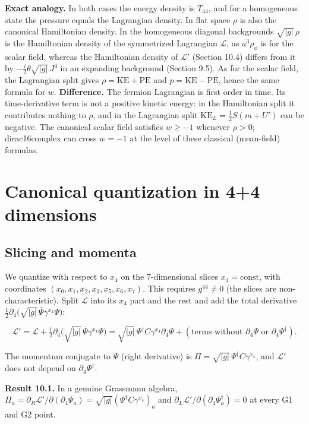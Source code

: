 \documentclass[11pt]{article}
\begin{document}
\textbf{Exact analogy.} In both cases the energy density is $T_{44}$, and for a homogeneous state the pressure equals the Lagrangian density. In flat space $\rho$ is also the canonical Hamiltonian density. In the homogeneous diagonal backgrounds $\sqrt{|g|}\,\rho$ is the Hamiltonian density of the symmetrized Lagrangian $\mathcal L$, as $a^3\rho_\phi$ is for the scalar field, whereas the Hamiltonian density of $\mathcal L'$ (Section 10.4) differs from it by $-\tfrac i2\theta\sqrt{|g|}\,J^4$ in an expanding background (Section 9.5). As for the scalar field, the Lagrangian split gives $\rho=\mathrm{KE}+\mathrm{PE}$ and $p=\mathrm{KE}-\mathrm{PE}$, hence the same formula for $w$. \textbf{Difference.} The fermion Lagrangian is first order in time. Its time-derivative term is not a positive kinetic energy: in the Hamiltonian split it contributes nothing to $\rho$, and in the Lagrangian split $\mathrm{KE}_L=\tfrac12S(m+U')$ can be negative. The canonical scalar field satisfies $w\ge-1$ whenever $\rho>0$; dirac16complex can cross $w=-1$ at the level of these classical (mean-field) formulas.

\section{Canonical quantization in 4+4 dimensions}

\subsection{Slicing and momenta}

We quantize with respect to $x_4$ on the 7-dimensional slices $x_4=\text{const}$, with coordinates $(x_0,x_1,x_2,x_3,x_5,x_6,x_7)$. This requires $g^{44}\ne0$ (the slices are non-characteristic). Split $\mathcal L$ into its $x_4$ part and the rest and add the total derivative $\tfrac12\partial_4\bigl(\sqrt{|g|}\,\bar\Psi\gamma^{x_4}\Psi\bigr)$:

\[
\mathcal L'=\mathcal L+\tfrac12\partial_4\bigl(\sqrt{|g|}\,\bar\Psi\gamma^{x_4}\Psi\bigr)=\sqrt{|g|}\,\Psi^\dagger C\gamma^{x_4}\partial_4\Psi+(\text{terms without }\partial_4\Psi\text{ or }\partial_4\Psi^\dagger).
\]

The momentum conjugate to $\Psi$ (right derivative) is $\Pi=\sqrt{|g|}\,\Psi^\dagger C\gamma^{x_4}$, and $\mathcal L'$ does not depend on $\partial_4\Psi^\dagger$.

\textbf{Result 10.1.} In a genuine Grassmann algebra, $\Pi_a=\partial_R\mathcal L'/\partial(\partial_4\Psi_a)=\sqrt{|g|}(\Psi^\dagger C\gamma^{x_4})_a$ and $\partial_L\mathcal L'/\partial(\partial_4\Psi^\dagger_a)=0$ at every G1 and G2 point.
\end{document}
